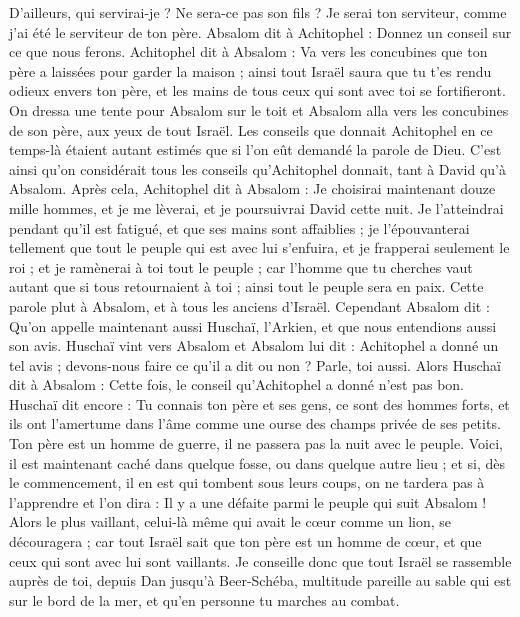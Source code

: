 \begin{multicols}{2}
D’ailleurs, qui servirai-je ? Ne sera-ce pas son fils ? Je serai ton serviteur, comme j'ai été le serviteur de ton père.
Absalom dit à Achitophel : Donnez un conseil sur ce que nous ferons.
Achitophel dit à Absalom : Va vers les concubines que ton père a laissées pour garder la maison ; ainsi tout Israël saura que tu t’es rendu odieux envers ton père, et les mains de tous ceux qui sont avec toi se fortifieront.
On dressa une tente pour Absalom sur le toit et Absalom alla vers les concubines de son père, aux yeux de tout Israël.
Les conseils que donnait Achitophel en ce temps-là étaient autant estimés que si l’on eût demandé la parole de Dieu. C’est ainsi qu'on considérait tous les conseils qu'Achitophel donnait, tant à David qu'à Absalom.
\VerseOne{}Après cela, Achitophel dit à Absalom : Je choisirai maintenant douze mille hommes, et je me lèverai, et je poursuivrai David cette nuit.
Je l’atteindrai pendant qu’il est fatigué, et que ses mains sont affaiblies ; je l'épouvanterai tellement que tout le peuple qui est avec lui s'enfuira, et je frapperai seulement le roi ;
et je ramènerai à toi tout le peuple ; car l'homme que tu cherches vaut autant que si tous retournaient à toi ; ainsi tout le peuple sera en paix.
Cette parole plut à Absalom, et à tous les anciens d'Israël.
Cependant Absalom dit : Qu'on appelle maintenant aussi Huschaï, l’Arkien, et que nous entendions aussi son avis.
Huschaï vint vers Absalom et Absalom lui dit : Achitophel a donné un tel avis ; devons-nous faire ce qu'il a dit ou non ? Parle, toi aussi.
Alors Huschaï dit à Absalom : Cette fois, le conseil qu’Achitophel a donné n'est pas bon.
Huschaï dit encore : Tu connais ton père et ses gens, ce sont des hommes forts, et ils ont l’amertume dans l’âme comme une ourse des champs privée de ses petits. Ton père est un homme de guerre, il ne passera pas la nuit avec le peuple.
Voici, il est maintenant caché dans quelque fosse, ou dans quelque autre lieu ; et si, dès le commencement, il en est qui tombent sous leurs coups, on ne tardera pas à l'apprendre et l'on dira : Il y a une défaite parmi le peuple qui suit Absalom !
Alors le plus vaillant, celui-là même qui avait le cœur comme un lion, se découragera ; car tout Israël sait que ton père est un homme de cœur, et que ceux qui sont avec lui sont vaillants.
Je conseille donc que tout Israël se rassemble auprès de toi, depuis Dan jusqu'à Beer-Schéba, multitude pareille au sable qui est sur le bord de la mer, et qu’en personne tu marches au combat.

\end{multicols}
